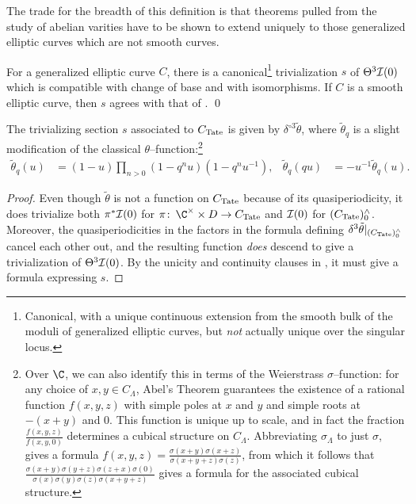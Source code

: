 \noindent The trade for the breadth of this definition is that theorems pulled from the study of abelian varities have to be shown to extend uniquely to those generalized elliptic curves which are not smooth curves.

\begin{theorem}\label{GeneralizedTheta3IsTrivial}
For a generalized elliptic curve \(C\), there is a canonical\footnote{Canonical, with a unique continuous extension from the smooth bulk of the moduli of generalized elliptic curves, but \emph{not} actually unique over the singular locus.} trivialization \(s\) of \(\Theta^3 \mathcal{I}(0)\) which is compatible with change of base and with isomorphisms.  If \(C\) is a smooth elliptic curve, then \(s\) agrees with that of . \qed
\end{theorem}

\begin{corollary}\label{D3thetaTrivializes}
The trivializing section \(s\) associated to \(C_{\mathrm{Tate}}\) is given by \(\delta^{\circ 3} \tilde \theta\), where \(\tilde \theta_q\) is a slight modification of the classical \(\theta\)--function:\footnote{Over \(\C\), we can also identify this in terms of the Weierstrass \(\sigma\)--function: for any choice of \(x, y \in C_\Lambda\), Abel's Theorem guarantees the existence of a rational function \(f(x, y, z)\) with simple poles at \(x\) and \(y\) and simple roots at \(-(x+y)\) and \(0\).  This function is unique up to scale, and in fact the fraction \(\frac{f(x,y,z)}{f(x,y,0)}\) determines a cubical structure on \(C_\Lambda\).  Abbreviating \(\sigma_\Lambda\) to just \(\sigma\),  gives a formula \(f(x,y,z) = \frac{\sigma(x+y)\sigma(x+z)}{\sigma(x+y+z)\sigma(z)}\), from which it follows that \(\frac{\sigma(x+y)\sigma(y+z)\sigma(z+x)\sigma(0)}{\sigma(x)\sigma(y)\sigma(z)\sigma(x+y+z)}\) gives a formula for the associated cubical structure.}
\begin{align*}
\tilde \theta_q(u) & = (1 - u)\prod_{n > 0}(1 - q^n u)(1 - q^n u^{-1}), &
\tilde \theta_q(qu) & = -u^{-1} \tilde\theta_q(u).
\end{align*}
\end{corollary}
\begin{proof}
Even though \(\tilde \theta\) is not a function on \(C_{\mathrm{Tate}}\) because of its quasiperiodicity, it does trivialize both \(\pi^* \mathcal{I}(0)\) for \(\pi\co \C^\times \times D \to C_{\Tate}\) and \(\mathcal{I}(0)\) for \((C_{\mathrm{Tate}})^\wedge_0\).  Moreover, the quasiperiodicities in the factors in the formula defining \(\delta^3 \tilde \theta|_{(C_{\mathrm{Tate}})^\wedge_0}\) cancel each other out, and the resulting function \emph{does} descend to give a trivialization of \(\Theta^3 \mathcal{I}(0)\).  By the unicity and continuity clauses in , it must give a formula expressing \(s\).
\end{proof}

